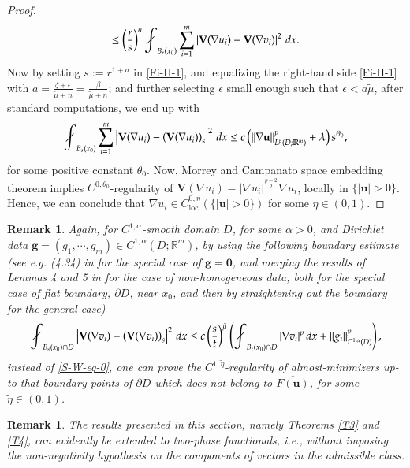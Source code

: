 \documentclass{amsart}
\newtheorem{remark}[theorem]{Remark}
\def\avint{\mathop{\,\rlap{$\diagup$}\!\!\int}\nolimits}
\begin{document}
\begin{proof}
$$\begin{aligned}
\leq \left( \frac{r}{s} \right)^n \avint_{B_{r}(x_0)} \sum_{i=1}^{m} \left|\mathbf{V}(\nabla u_i)-\mathbf{V}(\nabla v_i) \right|^2 \, dx. 
\end{aligned}
$$ 
Now by setting $s:=r^{1+a}$ in \eqref{Fi-H-1}, and  equalizing 
the right-hand side \eqref{Fi-H-1} with 
$a=\frac{\zeta+\epsilon}{\tilde{\mu}+n}= \frac{\beta}{\tilde{\mu}+n}$; and further selecting $\epsilon$ small enough such that $\epsilon < a\tilde \mu$,
after standard computations, we end up with
$$
\avint_{B_s(x_0)} \sum_{i=1}^{m} \left| \mathbf{V}(\nabla u_i)-\left(\mathbf{V}(\nabla u_i) \right)_s \right|^2 \, dx \leq c \left( \|\nabla \mathbf{u}\|_{L^{p}(D; \mathbb{R}^m)}^p + \lambda \right) s^{\theta_0},
$$ 
for some positive constant $\theta_0$. 
Now, Morrey and Campanato space embedding theorem implies $C^{0,\theta_0}$-regularity of $\mathbf{V}(\nabla u_i)= |\nabla u_i|^{\frac{p-2}2}\nabla u_i$, locally in $\{|\mathbf{u}|>0\}$.
Hence, we can conclude that $\nabla u_i \in C_{\mathrm{loc}}^{0,\eta}(\{|\mathbf{u}|>0\})$ for some $\eta\in(0,1)$.
\end{proof}

\begin{remark}
\label{Remark-e-02}
Again, for $C^{1,\alpha}$-smooth domain $D$, for some $\alpha>0$, and 
 Dirichlet data $\mathbf{g}=(g_1, \cdots, g_m) \in C^{1,\alpha}(D;\mathbb{R}^m)$,
by using the following boundary estimate (see e.g. (4.34) in \cite[Lemma 4.5]{beck2008boundary} for the special case of $\mathbf{g}=\mathbf{0}$, and merging the results of Lemmas 4 and 5 in \cite{lieberman1988boundary} for the case of non-homogeneous data, both for the special case of flat boundary, $\partial D$, near $x_0$, and then by straightening out the 
boundary for the general case) 
$$
\avint_{B_s(x_0) \cap D} \left|\mathbf{V}(\nabla v_i)-\left(\mathbf{V}(\nabla v_i) \right)_s \right|^2 \, dx \leq c \left(\frac{s}{t} \right)^{\tilde{\mu}} \left(\avint_{B_t(x_0) \cap D}  |\nabla v_i|^p \, dx + \| g_i\|_{C^{1,\alpha}(D)}^p\right),
$$
instead of \eqref{S-W-eq-0}, one can prove the $C^{1,\tilde{\eta}}$-regularity of almost-minimizers up-to that boundary points of $\partial D$  which does not belong to $\overline{F(\mathbf{u})}$, for some $\tilde{\eta} \in (0,1)$.
\end{remark}



\begin{remark}
The results presented in this section, namely Theorems \ref{T3} and \ref{T4}, can evidently be extended to two-phase functionals, i.e.,  without imposing the non-negativity hypothesis on the  components of vectors in the  admissible class.
\end{remark}
\end{document}
